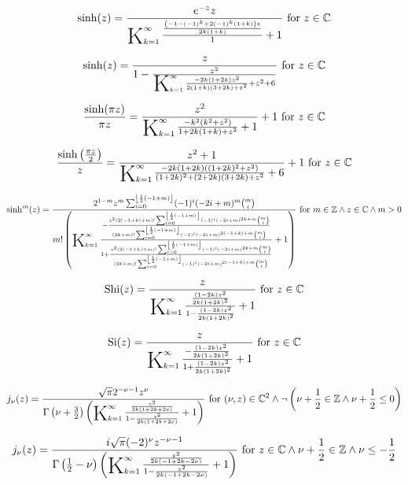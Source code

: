 \documentclass{article}
\newcommand{\bigK}{\mathop{\raisebox{-5pt}{\huge K}}}
\begin{document}
\[\sinh (z)=\frac{e^{-z} z}{\bigK_{k=1}^{\infty}\frac{\frac{\left(-1-(-1)^k+2 (-1)^k (1+k)\right) z}{2 k (1+k)}}{1}+1}\text{ for }z\in \mathbb{C}\] 

\[\sinh (z)=\frac{z}{1-\frac{z^2}{\bigK_{k=1}^{\infty}\frac{-2 k (1+2 k) z^2}{2 (1+k) (3+2 k)+z^2}+z^2+6}}\text{ for }z\in \mathbb{C}\] 

\[\frac{\sinh (\pi  z)}{\pi  z}=\frac{z^2}{\bigK_{k=1}^{\infty}\frac{-k^2 \left(k^2+z^2\right)}{1+2 k (1+k)+z^2}+1}+1\text{ for }z\in \mathbb{C}\] 

\[\frac{\sinh \left(\frac{\pi  z}{2}\right)}{z}=\frac{z^2+1}{\bigK_{k=1}^{\infty}\frac{-2 k (1+2 k) \left((1+2 k)^2+z^2\right)}{(1+2 k)^2+(2+2 k) (3+2 k)+z^2}+6}+1\text{ for }z\in \mathbb{C}\] 

\[\sinh ^m(z)=\frac{2^{1-m} z^m \sum _{i=0}^{\left\lfloor \frac{1}{2} (-1+m)\right\rfloor } (-1)^i (-2 i+m)^m \binom{m}{i}}{m! \left(\bigK_{k=1}^{\infty}\frac{-\frac{z^2 (2 (-1+k)+m)! \sum _{i=0}^{\left\lfloor \frac{1}{2} (-1+m)\right\rfloor } (-1)^i (-2 i+m)^{2 k+m} \binom{m}{i}}{(2 k+m)! \sum _{i=0}^{\left\lfloor \frac{1}{2} (-1+m)\right\rfloor } (-1)^i (-2 i+m)^{2 (-1+k)+m} \binom{m}{i}}}{1+\frac{z^2 (2 (-1+k)+m)! \sum _{i=0}^{\left\lfloor \frac{1}{2} (-1+m)\right\rfloor } (-1)^i (-2 i+m)^{2 k+m} \binom{m}{i}}{(2 k+m)! \sum _{i=0}^{\left\lfloor \frac{1}{2} (-1+m)\right\rfloor } (-1)^i (-2 i+m)^{2 (-1+k)+m} \binom{m}{i}}}+1\right)}\text{ for }m\in \mathbb{Z}\land z\in \mathbb{C}\land m>0\] 

\[\text{Shi}(z)=\frac{z}{\bigK_{k=1}^{\infty}\frac{\frac{(1-2 k) z^2}{2 k (1+2 k)^2}}{1-\frac{(1-2 k) z^2}{2 k (1+2 k)^2}}+1}\text{ for }z\in \mathbb{C}\] 

\[\text{Si}(z)=\frac{z}{\bigK_{k=1}^{\infty}\frac{-\frac{(1-2 k) z^2}{2 k (1+2 k)^2}}{1+\frac{(1-2 k) z^2}{2 k (1+2 k)^2}}+1}\text{ for }z\in \mathbb{C}\] 

\[j_{\nu }(z)=\frac{\sqrt{\pi } 2^{-\nu -1} z^{\nu }}{\Gamma \left(\nu +\frac{3}{2}\right) \left(\bigK_{k=1}^{\infty}\frac{\frac{z^2}{2 k (1+2 k+2 \nu )}}{1-\frac{z^2}{2 k (1+2 k+2 \nu )}}+1\right)}\text{ for }(\nu ,z)\in \mathbb{C}^2\land \neg \left(\nu +\frac{1}{2}\in \mathbb{Z}\land \nu +\frac{1}{2}\leq 0\right)\] 

\[j_{\nu }(z)=\frac{i \sqrt{\pi } (-2)^{\nu } z^{-\nu -1}}{\Gamma \left(\frac{1}{2}-\nu \right) \left(\bigK_{k=1}^{\infty}\frac{\frac{z^2}{2 k (-1+2 k-2 \nu )}}{1-\frac{z^2}{2 k (-1+2 k-2 \nu )}}+1\right)}\text{ for }z\in \mathbb{C}\land \nu +\frac{1}{2}\in \mathbb{Z}\land \nu \leq -\frac{1}{2}\] 
\end{document}
